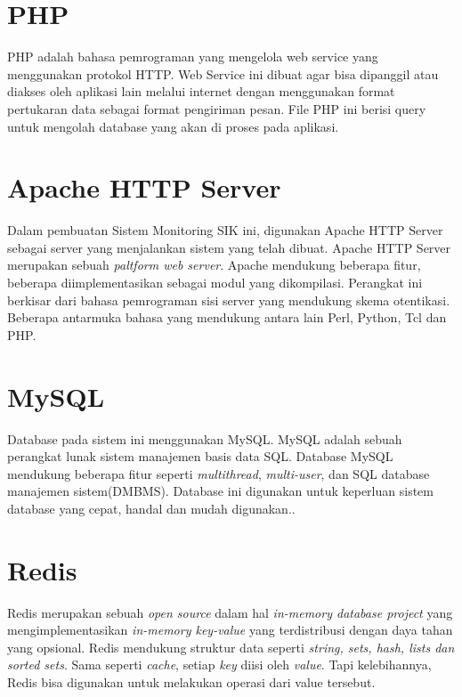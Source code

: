\section{PHP}
\tab PHP adalah bahasa pemrograman yang mengelola web service yang menggunakan protokol HTTP. Web Service ini dibuat agar bisa dipanggil atau diakses oleh aplikasi lain melalui internet dengan menggunakan format pertukaran data sebagai format pengiriman pesan. File PHP ini berisi query untuk mengolah database yang akan di proses pada aplikasi\cite{PHP}.

\section{Apache HTTP Server}
\tab Dalam pembuatan Sistem Monitoring SIK ini, digunakan Apache HTTP Server sebagai server yang menjalankan sistem yang telah dibuat. Apache HTTP Server merupakan sebuah \textit{paltform web server}. Apache mendukung beberapa fitur, beberapa diimplementasikan sebagai modul yang dikompilasi. Perangkat ini berkisar dari bahasa pemrograman sisi server yang mendukung skema otentikasi. Beberapa antarmuka bahasa yang mendukung antara lain Perl, Python, Tcl dan PHP\cite{apache}.

\section{MySQL }
\tab Database pada sistem ini menggunakan MySQL. MySQL adalah sebuah perangkat lunak sistem manajemen basis data SQL. Database MySQL mendukung beberapa fitur seperti \textit{multithread}, \textit{multi-user}, dan SQL database manajemen sistem(DMBMS). Database ini digunakan untuk keperluan sistem database yang cepat, handal dan mudah digunakan.\cite{mysql}.

\section{Redis}
\tab Redis merupakan sebuah \textit{open source} dalam hal \textit{in-memory database project} yang mengimplementasikan \textit{in-memory key-value} yang terdistribusi dengan daya tahan yang opsional. Redis mendukung struktur data seperti \textit{string, sets, hash, lists dan sorted sets}. Sama seperti \textit{cache}, setiap \textit{key} diisi oleh \textit{value}. Tapi kelebihannya, Redis bisa digunakan untuk melakukan operasi dari value tersebut.\cite{redis}